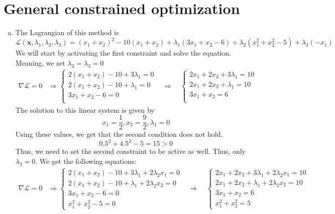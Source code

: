 \documentclass{article}
\begin{document}
\section{General constrained optimization}
\begin{enumerate}[(a)]
\item The Lagrangian of this method is
\[
\mathcal{L}(\mathbf{x}, \lambda_1, \lambda_2, \lambda_3) =  (x_1 + x_2)^2 - 10(x_1 + x_2) + \lambda_1(3x_1  + x_2 - 6) + \lambda_2(x_1^2+x_2^2-5) + \lambda_3(-x_1)
\]
We will start by activating the first constraint and solve the equation. Meaning, we set $\lambda_2 = \lambda_3 = 0$
\begin{align*}
\nabla \mathcal{L} = 0 &\Rightarrow
\begin{cases}
2(x_1 + x_2) - 10 +3\lambda_1 = 0\\
2(x_1 + x_2) - 10 +\lambda_1 = 0\\
3x_1 + x_2 - 6 = 0 \\
\end{cases}
&\Rightarrow \quad
\begin{cases}
2x_1 + 2x_2 + 3\lambda_1 = 10\\
2x_1 + 2x_2 + \lambda_1 = 10 \\
3x_1 + x_2 = 6\\
\end{cases}
\end{align*}
The solution to this linear system is given by
\[x_1=\frac{1}{2}, x_2=\frac{9}{2}, \lambda_1=0\]
Using these values, we get that the second condition does not hold.
\[0.5^2 + 4.5^2 - 5 = 15 > 0 \]
Thus, we need to set the second constraint to be active as well. Thus, only $\lambda_3=0$. We get the following equations:
\begin{align*}
\nabla \mathcal{L} = 0 &\Rightarrow
\begin{cases}
2(x_1 + x_2) - 10 +3\lambda_1 + 2\lambda_2 x_1 = 0\\
2(x_1 + x_2) - 10 +\lambda_1 + 2\lambda_2 x_2 = 0\\
3x_1 + x_2 - 6 = 0 \\
x_1^2 + x_2^2 - 5 = 0
\end{cases}
&\Rightarrow \quad
\begin{cases}
2x_1 + 2x_2 + 3\lambda_1 + 2\lambda_2 x_1 = 10\\
2x_1 + 2x_2 + \lambda_1 + 2\lambda_2 x_2 = 10 \\
3x_1 + x_2 = 6\\
x_1^2 + x_2^2 = 5
\end{cases}
\end{align*}

\end{enumerate}
\end{document}
